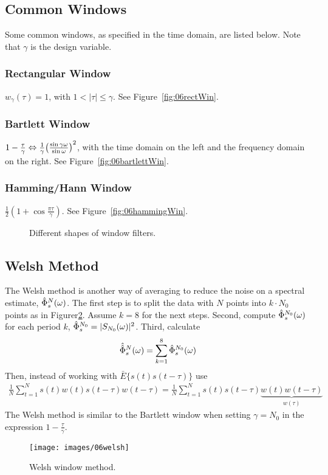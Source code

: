 \subsection{Common Windows}
Some common windows, as specified in the time domain, are listed below.
Note that $\gamma$ is the design variable.

\subsubsection{Rectangular Window}
$w_\gamma(\tau) = 1$, with $1<|\tau|\leq\gamma$.
See Figure~\ref{fig:06rectWin}.

\subsubsection{Bartlett Window}
$1-\frac{\tau}{\gamma} \Leftrightarrow \frac{1}{\gamma}{\left(\frac{\sin\gamma\omega}{\sin\omega}\right)}^2$, with the time domain on the left and the frequency domain on the right.
See Figure~\ref{fig:06bartlettWin}.

\subsubsection{Hamming/Hann Window}
$\frac{1}{2}\left(1+\cos\frac{\pi\tau}{\gamma}\right)$.
See Figure~\ref{fig:06hammingWin}.

\begin{figure}[ht!]
\centering
{}\hfill
{}\hfill
{}
\caption{Different shapes of window filters.}
\label{fig:06filterShapes}
\end{figure}

\subsection{Welsh Method}
The Welsh method is another way of averaging to reduce the noise on a spectral estimate, $\hat{\Phi}_s^N(\omega)$.
The first step is to split the data with $N$ points into $k\cdot N_0$ points as in Figurer\ref{fig:06welsh}.
Assume $k=8$ for the next steps.
Second, compute $\hat{\Phi}_s^{N_0}(\omega)$ for each period $k$, $\hat{\Phi}_s^{N_0} = |S_{N_0}(\omega)|^2$.
Third, calculate
$$\hat{\hat{\Phi}}_s^N(\omega) = \sum_{k=1}^8 \hat{\Phi}_s^{N_0}(\omega)$$
Then, instead of working with $\bar{E}\{s(t)s(t-\tau)\}$ use
\begin{align*}
\frac{1}{N}\sum_{t=1}^N s(t)w(t)s(t-\tau)w(t-\tau) =
\frac{1}{N}\sum_{t=1}^N s(t)s(t-\tau) \underbrace{w(t)w(t-\tau)}_{w(\tau)}
\end{align*}
The Welsh method is similar to the Bartlett window when setting $\gamma=N_0$ in the expression $1-\frac{\tau}{\gamma}$.

\begin{figure}[ht!]
\centering
\texttt{[image: images/06welsh]}
\caption{Welsh window method.}
\label{fig:06welsh}
\end{figure}
